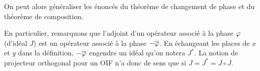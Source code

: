 On peut alors généraliser les énoncés du théorème de changement de phase et du théorème de composition.

En particulier, remarquons que l'adjoint d'un opérateur associé à la phase $\varphi$ (d'idéal $J$) est un opérateur associé à la phase $-\overline{\varphi}$. En échangeant les places de $x$ et $y$ dans la définition, $-\overline{\varphi}$ engendre un idéal qu'on notera $J^*$. La notion de projecteur orthogonal pour un OIF n'a donc de sens que si $J=J^*=J\circ J$.